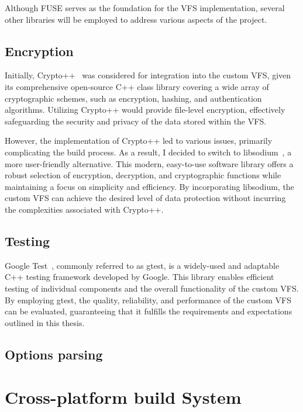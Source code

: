Although FUSE serves as the foundation for the VFS implementation, several other libraries will be employed to address various aspects of the project.

\subsection{Encryption}\label{subsec:encryption-analysis}

Initially, Crypto++~\cite{crypto_pp} was considered for integration into the custom VFS, given its comprehensive open-source C++ class library covering a wide array of cryptographic schemes, such as encryption, hashing, and authentication algorithms.
Utilizing Crypto++ would provide file-level encryption, effectively safeguarding the security and privacy of the data stored within the VFS.

However, the implementation of Crypto++ led to various issues, primarily complicating the build process.
As a result, I decided to switch to libsodium~\cite{libsodium}, a more user-friendly alternative.
This modern, easy-to-use software library offers a robust selection of encryption, decryption, and cryptographic functions while maintaining a focus on simplicity and efficiency.
By incorporating libsodium, the custom VFS can achieve the desired level of data protection without incurring the complexities associated with Crypto++.

\subsection{Testing}\label{subsec:gtest}

Google Test~\cite{google_test}, commonly referred to as gtest, is a widely-used and adaptable C++ testing framework developed by Google.
This library enables efficient testing of individual components and the overall functionality of the custom VFS\@.
By employing gtest, the quality, reliability, and performance of the custom VFS can be evaluated, guaranteeing that it fulfills the requirements and expectations outlined in this thesis.

\subsection{Options parsing}


\section{Cross-platform build System}\label{sec:build-system-and-cross-platform-challenges}

